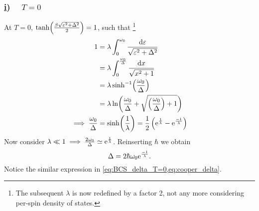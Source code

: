 \subsubsection*{\underline{i}) $\quad T = 0$}

At $T = 0$, $\tanh(\frac{\beta\sqrt{\varepsilon^2+\Delta^2}}{2}) = 1$, such that \footnote{The subsequent $\lambda$ is now redefined by a factor 2, not any more considering per-spin density of states.}	
\begin{align}
	1 &= \lambda\int_{0}^{\omega_0}\dfrac{\dd{\varepsilon}}{\sqrt{\varepsilon^2 + \Delta^2}} \nonumber\\
	&= \lambda\int_0^{\frac{\omega_0}{\Delta}}\dfrac{\dd{x}}{\sqrt{x^2+1}} \nonumber\\
	&= \lambda\sinh[-1](\dfrac{\omega_0}{\Delta}) \nonumber\\
	&=\lambda\ln(\dfrac{\omega_0}{\Delta} + \sqrt{\left (\dfrac{\omega_0}{\Delta}\right )+1 }) \nonumber\\
	\implies \dfrac{\omega_0}{\Delta} &= \sinh(\dfrac{1}{\lambda}) = \dfrac{1}{2}\left(\mathrm{e}^{\frac{1}{\lambda}}-\mathrm{e}^{\frac{-1}{\lambda}}\right)
\end{align}
Now consider $\lambda \ll 1 \implies \frac{2\omega_0}{\Delta}\simeq\mathrm{e}^{\frac{1}{\lambda}}$. Reinserting $\hbar$ we obtain 
\begin{equation}
\label{eq:BCS_delta_T=0}
\Delta = 2\hbar\omega_0\mathrm{e}^{\frac{-1}{\lambda}}.
\end{equation}
Notice the similar expression in \cref{eq:BCS_delta_T=0,eq:cooper_delta}.
